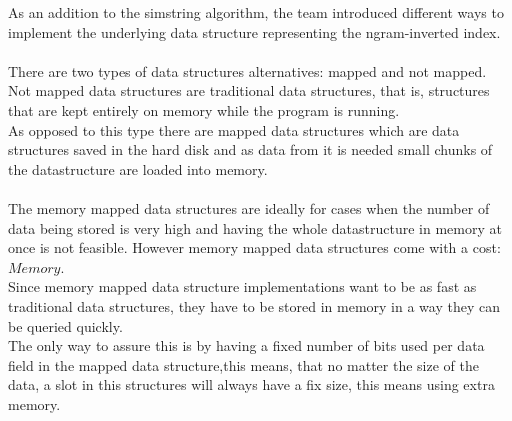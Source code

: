 As an addition to the simstring algorithm, the team introduced different ways to implement
the underlying data structure representing the ngram-inverted index.\\
\\
There are two types of data structures alternatives: mapped and not mapped.
Not mapped data structures are traditional data structures, that is, structures that are kept entirely on memory while the program is running. \\
As opposed to this type  there are mapped data structures which are data structures saved in the hard disk
and as data from it is needed small chunks of the datastructure are loaded into memory.\\
\\
The memory mapped data structures are ideally for cases when the number of data being stored is very high and having the whole datastructure in memory at once is not feasible.
However memory mapped data structures come with a cost: $Memory$.\\
Since memory mapped data structure implementations want to be as fast as traditional data structures, they have to be stored in memory in a way they can be queried quickly.\\
The only way to assure this is by having a fixed number of bits used per data field in the mapped data structure,this means, that no matter the size of the data, a slot in this structures will always have a fix size, this means using extra memory.


